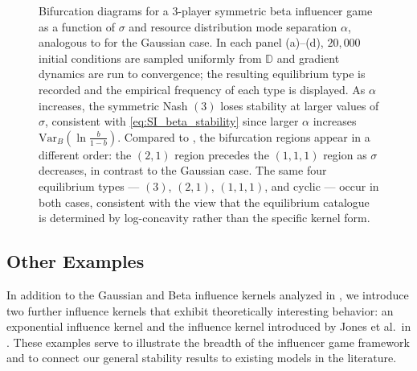 \documentclass{article}
\begin{document}
            \begin{figure}[ht!]
                \centering
                    
                \caption{Bifurcation diagrams for a 3-player symmetric beta influencer game as a function of $\sigma$ and resource distribution mode separation $\alpha$, analogous to  for the Gaussian case. In each panel (a)--(d), $20{,}000$ initial conditions are sampled uniformly from $\mathbb{D}$ and gradient dynamics are run to convergence; the resulting equilibrium type is recorded and the empirical frequency of each type is displayed. As $\alpha$ increases, the symmetric Nash $(3)$ loses stability at larger values of $\sigma$, consistent with \cref{eq:SI_beta_stability} since larger $\alpha$ increases $\mathrm{Var}_B\!\left(\ln\frac{b}{1-b}\right)$. Compared to , the bifurcation regions appear in a different order: the $(2,1)$ region precedes the $(1,1,1)$ region as $\sigma$ decreases, in contrast to the Gaussian case. The same four equilibrium types --- $(3)$, $(2,1)$, $(1,1,1)$, and cyclic --- occur in both cases, consistent with the view that the equilibrium catalogue is determined by log-concavity rather than the specific kernel form.}
            \label{fig:beta_bifurcation}
            \end{figure}
            \clearpage

        \subsection{Other Examples}
            In addition to the Gaussian and Beta influence kernels analyzed in , we introduce two further influence kernels that exhibit theoretically interesting behavior: an exponential influence kernel and the influence kernel introduced by Jones et al.\ in \cite{jones2022polarization}. These examples serve to illustrate the breadth of the influencer game framework and to connect our general stability results to existing models in the literature.
\end{document}
